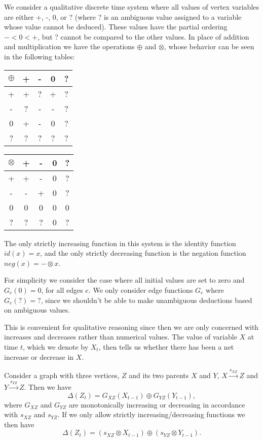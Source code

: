 We consider a qualitative discrete time system where all values of
vertex variables are either +, -, 0, or ? (where ? is an ambiguous
value assigned to a variable whose value cannot be deduced).
%
These values have the partial ordering $- < 0 < +$, but ? cannot be
compared to the other values.
%
In place of addition and multiplication we have the operations
$\oplus$ and $\otimes$, whose behavior can be seen in the following
tables:
\begin{center}
\begin{tabular}{c|cccc}
$\oplus$ & + & - & 0 & ?\\
\hline
  +   & +  & ? & + & ?\\
  -   & ?  & - & - & ?\\
  0   & +  & - & 0 & ?\\
  ?   & ?  & ? & ? & ?\\
\end{tabular}
\quad
\begin{tabular}{c|cccc}
$\otimes$ & + & - & 0 & ?\\
\hline
  +   & +  & - & 0 & ?\\
  -   & -  & + & 0 & ?\\
  0   & 0  & 0 & 0 & 0\\
  ?   & ?  & ? & 0 & ?\\
\end{tabular}
\end{center}
The only strictly increasing function in this system is the identity
function $id(x) = x$, and the only strictly decreasing function is the
negation function $neg(x) =-\otimes x$.

For simplicity we consider the case where all initial values are set
to zero and $G_e(0)=0$, for all edges $e$.
%
We only consider edge functions $G_e$ where $G_e(?) = ?$, since we
shouldn't be able to make unambiguous deductions based on ambiguous
values.
%

This is convenient for qualitative reasoning since then we are only
concerned with increases and decreases rather than numerical values.
%
The value of variable $X$ at time $t$, which we denote by $X_t$, then
tells us whether there has been a net increase or decrease in $X$.

Consider a graph with three vertices, $Z$ and its two parents $X$ and
$Y$, $X\xrightarrow{s_{XZ}} Z$ and $Y\xrightarrow{s_{YZ}} Z$.
%
Then we have
%
\[\Delta(Z_t) = G_{XZ}(X_{t-1}) \oplus G_{YZ}(Y_{t-1}),\]
%
where $G_{XZ}$ and $G_{YZ}$ are monotonically increasing or decreasing
in accordance with $s_{XZ}$ and $s_{YZ}$.
%
If we only allow strictly increasing/decreasing functions we then have
%
\[\Delta(Z_t) = (s_{XZ}\otimes X_{t-1})\oplus (s_{YZ}\otimes Y_{t-1}).\]

